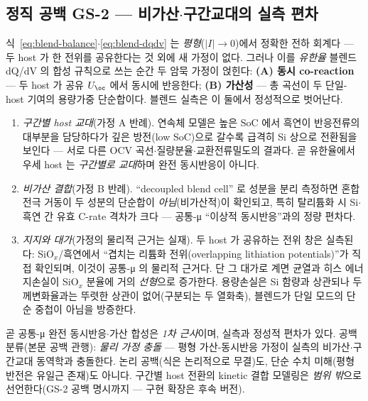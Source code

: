 \subsection{정직 공백 GS-2 --- 비가산$\cdot$구간교대의 실측 편차}\label{ssec:blend-gs2}
식~\eqref{eq:blend-balance}$\cdot$\eqref{eq:blend-dqdv} 는 \emph{평형}($|I|\to0$)에서 정확한 전하 회계다 ---
두 host 가 한 전위를 공유한다는 것 외에 새 가정이 없다. 그러나 이를 \emph{유한율} 블렌드 dQ/dV 의 합성
규칙으로 쓰는 순간 두 암묵 가정이 얹힌다: \textbf{(A) 동시 co-reaction} --- 두 host 가 공유 $U_\oc$ 에서
동시에 반응한다; \textbf{(B) 가산성} --- 총 곡선이 두 단일-host 기여의 용량가중 단순합이다. 블렌드 실측은
이 둘에서 정성적으로 벗어난다.
\begin{enumerate}[label=\arabic*.,leftmargin=2.0em,itemsep=1pt]
\item \emph{구간별 host 교대}(가정 A 반례). 연속체 모델은 높은 SoC 에서 흑연이 반응전류의 대부분을
담당하다가 깊은 방전(low SoC)으로 갈수록 급격히 Si 상으로 전환됨을 보인다 --- 서로 다른 OCV
곡선$\cdot$질량분율$\cdot$교환전류밀도의 결과다\cite{ai_composite2022}. 곧 유한율에서 우세 host 는
\emph{구간별로 교대}하며 완전 동시반응이 아니다.
\item \emph{비가산 결합}(가정 B 반례). ``decoupled blend cell'' 로 성분을 분리 측정하면 혼합 전극 거동이
두 성분의 단순합이 \emph{아님}(비가산적)이 확인되고, 특히 탈리튬화 시 Si$\cdot$흑연 간 유효 C-rate 격차가
크다\cite{chatzogiannakis_blend2025} --- 공통-μ ``이상적 동시반응''과의 정량 편차다.
\item \emph{지지와 대가}(가정의 물리적 근거는 실재). 두 host 가 공유하는 전위 창은 실측된다: SiO$_x$/흑연에서
``겹치는 리튬화 전위(overlapping lithiation potentials)''가 직접 확인되며\cite{zhan_siox2026}, 이것이
공통-μ 의 물리적 근거다. 단 그 대가로 계면 균열과 히스 에너지손실이 SiO$_x$ 분율에 거의 \emph{선형}으로
증가한다\cite{zhan_siox2026}. 용량손실은 Si 함량과 상관되나 두께변화율과는 뚜렷한 상관이 없어(구분되는 두
열화축)\cite{moyassari_blend2022}, 블렌드가 단일 모드의 단순 중첩이 아님을 방증한다.
\end{enumerate}
곧 공통-μ 완전 동시반응$\cdot$가산 합성은 \emph{1차 근사}이며, 실측과 정성적 편차가 있다. 공백 분류(본문
공백 관행): \emph{물리 가정 충돌} --- 평형 가산-동시반응 가정이 실측의 비가산$\cdot$구간교대 동역학과
충돌한다. 논리 공백(식은 논리적으로 무결)도, 단순 수치 미해(평형 반전은 유일근 존재)도 아니다. 구간별 host
전환의 kinetic 결합 모델링은 \emph{범위 밖}으로 선언한다(GS-2 공백 명시까지 --- 구현 확장은 후속 버전).

